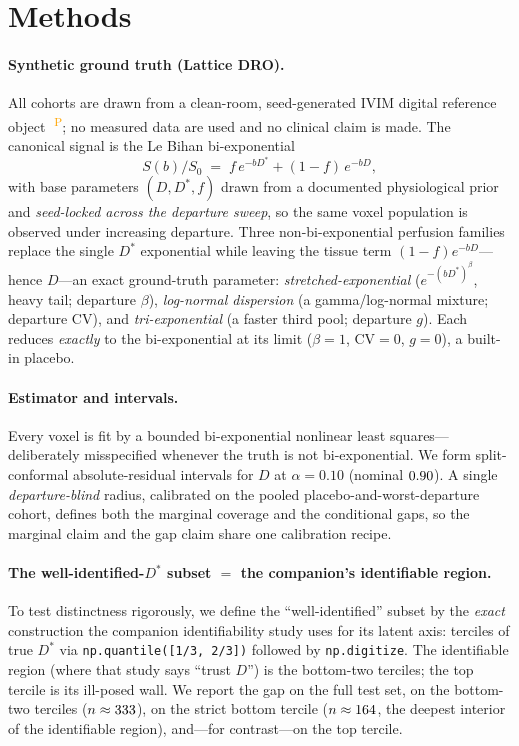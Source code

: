 \documentclass[11pt]{article}
\newcommand{\Dstar}{D^{*}}
\newcommand{\PROV}{\textsuperscript{\textcolor{orange}{\,P}}}
\begin{document}
\section{Methods}\label{sec:methods}
\paragraph{Synthetic ground truth (Lattice DRO).} All cohorts are drawn from a
clean-room, seed-generated IVIM digital reference object~\citep{lattice}\PROV{};
no measured data are used and no clinical claim is made. The canonical signal is
the Le Bihan bi-exponential~\citep{lebihan1988}
\[
  S(b)/S_0 \;=\; f\,e^{-b\Dstar} + (1-f)\,e^{-b D},
\]
with base parameters $(D,\Dstar,f)$ drawn from a documented physiological prior and
\emph{seed-locked across the departure sweep}, so the same voxel population is
observed under increasing departure. Three non-bi-exponential perfusion families
replace the single $\Dstar$ exponential while leaving the tissue term
$(1-f)e^{-bD}$---hence $D$---an exact ground-truth parameter:
\emph{stretched-exponential} ($e^{-(b\Dstar)^\beta}$, heavy tail; departure $\beta$),
\emph{log-normal dispersion} (a gamma/log-normal mixture; departure CV), and
\emph{tri-exponential} (a faster third pool; departure $g$). Each reduces
\emph{exactly} to the bi-exponential at its limit ($\beta=1$, CV$=0$, $g=0$), a
built-in placebo.

\paragraph{Estimator and intervals.} Every voxel is fit by a bounded
bi-exponential nonlinear least squares---deliberately misspecified whenever the
truth is not bi-exponential. We form split-conformal absolute-residual intervals
for $D$ at $\alpha=0.10$ (nominal $0.90$). A single \emph{departure-blind}
radius, calibrated on the pooled placebo-and-worst-departure cohort, defines both
the marginal coverage and the conditional gaps, so the marginal claim and the gap
claim share one calibration recipe.

\paragraph{The well-identified-$\Dstar$ subset $=$ the companion's identifiable region.}
To test distinctness rigorously, we define the ``well-identified'' subset by the
\emph{exact} construction the companion identifiability study uses for its latent
axis: terciles of true $\Dstar$ via \texttt{np.quantile([1/3,\,2/3])} followed by
\texttt{np.digitize}. The identifiable region (where that study says ``trust $D$'')
is the bottom-two terciles; the top tercile is its ill-posed wall. We report the
gap on the full test set, on the bottom-two terciles ($n\approx333$), on the
strict bottom tercile ($n\approx164$, the deepest interior of the identifiable
region), and---for contrast---on the top tercile.
\end{document}
